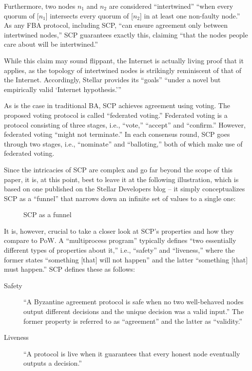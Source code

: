 Furthermore, two nodes $n_1$ and $n_2$ are considered ``intertwined'' ``when every quorum of [$n_1$] intersects every quorum of [$n_2$] in at least one non-faulty node.'' \autocite[4]{lokhava2019}
As any FBA protocol, including SCP, ``can ensure agreement only between intertwined nodes,'' SCP guarantees exactly this, claiming ``that the nodes people care about will be intertwined.'' \autocite[4]{lokhava2019}

While this claim may sound flippant, the Internet is actually living proof that it applies, as the topology of intertwined nodes is strikingly reminiscent of that of the Internet.
Accordingly, Stellar provides its ``goals'' \enquote{under a novel but empirically valid \enquote{Internet hypothesis.}} \autocite[1]{lokhava2019}

As is the case in traditional BA, SCP achieves agreement using voting.
The proposed voting protocol is called ``federated voting.''
Federated voting is a protocol consisting of three stages, i.e., ``vote,'' ``accept'' and ``confirm.'' \autocite[6]{lokhava2019}
However, federated voting ``might not terminate.'' \autocite[6]{lokhava2019}
In each consensus round, SCP goes through two stages, i.e., ``nominate'' and ``balloting,'' both of which make use of federated voting. \autocite[5, 6]{lokhava2019}

Since the intricacies of SCP are complex and go far beyond the scope of this paper, it is, at this point, best to leave it at the following illustration, which is based on one published on the Stellar Developers blog -- it simply conceptualizes SCP as a ``funnel'' that narrows down an infinite set of values to a single one: \autocite{stellar2019intuitivescp}
\\
\begin{figure}[H]
	\centering
	
	\caption*{SCP as a funnel}
\end{figure}

It is, however, crucial to take a closer look at SCP's properties and how they compare to PoW.
A ``multiprocess program'' typically defines ``two essentially different types of properties about it,'' i.e., ``safety'' and ``liveness,'' where the former states ``something [that] will not happen'' and the latter ``something [that] must happen.'' \autocite[125]{lamport1977}
SCP defines these as follows:
 
\begin{description}
	\item[Safety]
		``A Byzantine agreement protocol is safe when no two well-behaved nodes output different decisions and the unique decision was a valid input.'' \autocite[3]{lokhava2019}
		The former property is referred to as ``agreement'' and the latter as ``validity.'' \autocite{mazieres2019safetyvsliveness}
	\item[Liveness]
		``A protocol is live when it guarantees that every honest node eventually outputs a decision.'' \autocite[4]{lokhava2019}
\end{description}

